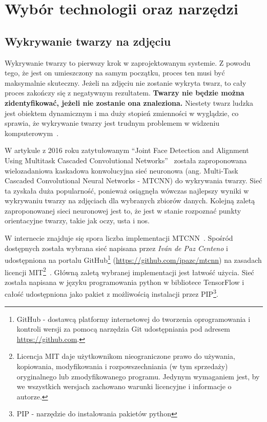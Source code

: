 \chapter{Wybór technologii oraz narzędzi}


\section{Wykrywanie twarzy na zdjęciu}

Wykrywanie twarzy to pierwszy krok w zaprojektowanym systemie.
Z powodu tego, że jest on umieszczony na samym początku, proces ten musi być maksymalnie skuteczny.
Jeżeli na zdjęciu nie zostanie wykryta twarz, to cały proces zakończy się z negatywnym rezultatem.
\textbf{Twarzy nie będzie można zidentyfikować, jeżeli nie zostanie ona znaleziona.}
Niestety twarz ludzka jest obiektem dynamicznym i ma duży stopień zmienności w wyglądzie,
co sprawia, że wykrywanie twarzy jest trudnym problemem w widzeniu komputerowym~\cite{HJELMAS2001236}.

W artykule z 2016 roku zatytułowanym
``Joint Face Detection and Alignment Using Multitask Cascaded Convolutional Networks''~\cite{zhang2016joint}
została zaproponowana wielozadaniowa kaskadowa konwolucyjna sieć neuronowa
(ang. Multi-Task Cascaded Convolutional Neural Networks - MTCNN) do wykrywania twarzy.
Sieć ta zyskała duża popularność, ponieważ osiągnęła wówczas najlepszy wyniki
w wykrywaniu twarzy na zdjęciach dla wybranych zbiorów danych.
Kolejną zaletą zaproponowanej sieci neuronowej jest to, że jest w stanie
rozpoznać punkty orientacyjne twarzy, takie jak oczy, usta i nos.

W internecie znajduje się spora liczba implementacji MTCNN~\cite{mtznn_all_impls}.
Spośród dostępnych została wybrana sieć napisana przez \textit{Iván de Paz Centeno}
i udostępniona na portalu GitHub\footnote{GitHub - dostawcą platformy internetowej do tworzenia
oprogramowania i kontroli wersji za pomocą narzędzia Git udostępniania
pod adresem \url{https://github.com}. } (\url{https://github.com/ipazc/mtcnn}) na zasadach licencji MIT\footnote{Licencja MIT daje użytkownikom
nieograniczone prawo do używania, kopiowania, modyfikowania i rozpowszechniania (w tym sprzedaży)
    oryginalnego lub zmodyfikowanego programu.
    Jedynym wymaganiem jest, by we wszystkich wersjach zachowano warunki licencyjne i informacje o autorze.
}~\cite{ipazc/mtcnn}.
Główną zaletą wybranej implementacji jest łatwość użycia.
Sieć została napisana w języku programowania python w bibliotece TensorFlow
i całość udostępniona jako pakiet z możliwością instalacji
przez PIP\footnote{PIP - narzędzie do instalowania pakietów python}.


